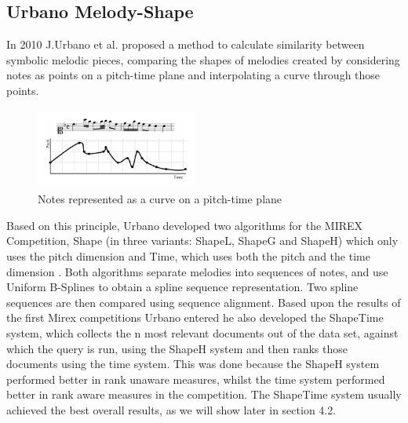 \documentclass{llncs}
\begin{document}
\begin{itemize}
		
		\subsection{Urbano Melody-Shape}
        In 2010 J.Urbano et al. \cite{five_point_five}proposed a method to calculate similarity between symbolic melodic pieces, comparing the shapes of melodies created by considering notes as points on a pitch-time plane and interpolating a curve through those points. 
           \begin{figure}[h!]
			\centering
	        \includegraphics[width=200px,height=100px,keepaspectratio]{one_of_five_point_one}
				\caption{Notes represented as a curve on a pitch-time plane \cite{five_point_two}}
        	\end{figure}
        Based on this principle, Urbano developed two algorithms for the MIREX Competition, Shape (in three variants: ShapeL, ShapeG and ShapeH) which only uses the pitch dimension and Time, which uses both the pitch and the time dimension \cite{five_point_two}. Both algorithms separate melodies into sequences of notes, and use Uniform B-Splines to obtain a spline sequence representation. Two spline sequences are then compared using sequence alignment. Based upon the results of the first Mirex competitions Urbano entered he also developed the ShapeTime system, which collects the n most relevant documents out of the data set, against which the query is run, using the ShapeH system and then ranks those documents using the time system. This was done because the ShapeH system performed better in rank unaware measures, whilst the time system performed better in rank aware measures in the competition. The ShapeTime system usually achieved the best overall results, as we will show later in section 4.2.

\end{itemize}
\end{document}

